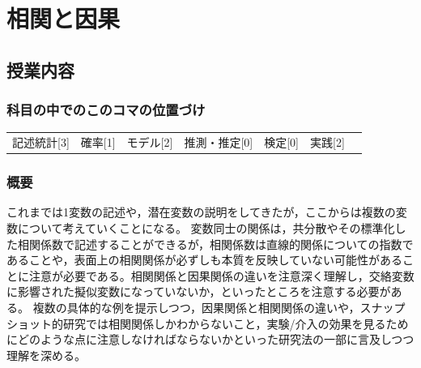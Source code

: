 \section{相関と因果}
\label{s08_CorrelationCausation}

\subsection{授業内容}
\subsubsection{科目の中でのこのコマの位置づけ}
\begin{tabular}[t]{ccccccc}
	記述統計[3] & 確率[1] & モデル[2] & 推測・推定[0] & 検定[0] & 実践[2]
\end{tabular}

\subsubsection{概要}
これまでは1変数の記述や，潜在変数の説明をしてきたが，ここからは複数の変数について考えていくことになる。
変数同士の関係は，共分散やその標準化した相関係数で記述することができるが，相関係数は直線的関係についての指数であることや，表面上の相関関係が必ずしも本質を反映していない可能性があることに注意が必要である。相関関係と因果関係の違いを注意深く理解し，交絡変数に影響された擬似変数になっていないか，といったところを注意する必要がある。
複数の具体的な例を提示しつつ，因果関係と相関関係の違いや，スナップショット的研究では相関関係しかわからないこと，実験/介入の効果を見るためにどのような点に注意しなければならないかといった研究法の一部に言及しつつ理解を深める。

